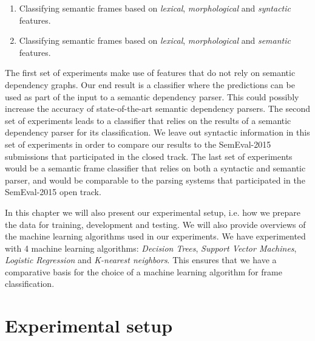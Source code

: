 \begin{enumerate}
    \item Classifying semantic frames based on \textit{lexical}, \textit{morphological} and \textit{syntactic} features.
    \item Classifying semantic frames based on \textit{lexical}, \textit{morphological} and \textit{semantic} features.
\end{enumerate}

The first set of experiments make use of features that do not rely on semantic dependency graphs. Our end result is a classifier where the predictions can be used as part of the input to a semantic dependency parser. This could possibly increase the accuracy of state-of-the-art semantic dependency parsers. The second set of experiments leads to a classifier that relies on the results of a semantic dependency parser for its classification. We leave out syntactic information in this set of experiments in order to compare our results to the SemEval-2015 submissions that participated in the closed track. The last set of experiments would be a semantic frame classifier that relies on both a syntactic and semantic parser, and would be comparable to the parsing systems that participated in the SemEval-2015 open track.

In this chapter we will also present our experimental setup, i.e. how we prepare the data for training, development and testing. We will also provide overviews of the machine learning algorithms used in our experiments. We have experimented with 4 machine learning algorithms: \textit{Decision Trees}, \textit{Support Vector Machines}, \textit{Logistic Regression} and \textit{K-nearest neighbors}. This ensures that we have a comparative basis for the choice of a machine learning algorithm for frame classification.


\section{Experimental setup}
\label{setup}

